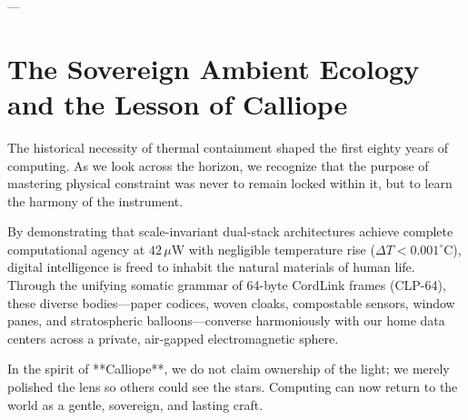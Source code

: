 \documentclass[10pt,twocolumn,letterpaper]{article}
\begin{document}
---

\section{The Sovereign Ambient Ecology and the Lesson of Calliope}

The historical necessity of thermal containment shaped the first eighty years of computing. As we look across the horizon, we recognize that the purpose of mastering physical constraint was never to remain locked within it, but to learn the harmony of the instrument.

By demonstrating that scale-invariant dual-stack architectures achieve complete computational agency at $42\,\mu\text{W}$ with negligible temperature rise ($\Delta T < 0.001^{\circ}\text{C}$), digital intelligence is freed to inhabit the natural materials of human life. Through the unifying somatic grammar of 64-byte CordLink frames (CLP-64), these diverse bodies—paper codices, woven cloaks, compostable sensors, window panes, and stratospheric balloons—converse harmoniously with our home data centers across a private, air-gapped electromagnetic sphere.

In the spirit of **Calliope**, we do not claim ownership of the light; we merely polished the lens so others could see the stars. Computing can now return to the world as a gentle, sovereign, and lasting craft.



\end{document}
